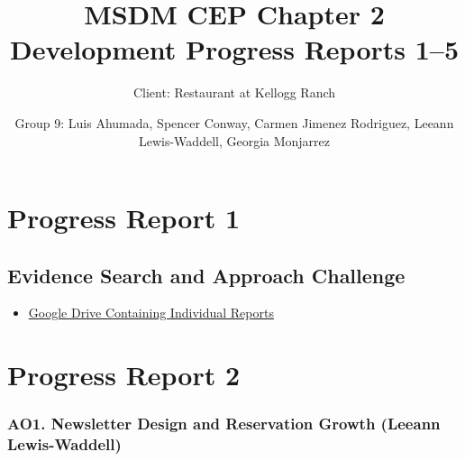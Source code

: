 \documentclass[
  12pt,
  letterpaper,
  DIV=11,
  numbers=noendperiod]{scrartcl}
\title{MSDM CEP Chapter 2 Development Progress Reports 1--5}
\subtitle{Client: Restaurant at Kellogg Ranch}
\author{Group 9: Luis Ahumada, Spencer Conway, Carmen Jimenez Rodriguez,
Leeann Lewis-Waddell, Georgia Monjarrez}
\date{}
\providecommand{\tightlist}{%
  \setlength{\itemsep}{0pt}\setlength{\parskip}{0pt}}
\renewcommand*\contentsname{Table of contents}
\newcommand\contentsname{Table of contents}
\begin{document}
\maketitle

\renewcommand*\contentsname{Table of contents}
{
\hypersetup{linkcolor=}
\setcounter{tocdepth}{3}
\tableofcontents
}

\section{Progress Report 1}\label{progress-report-1}

\subsection{Evidence Search and Approach
Challenge}\label{evidence-search-and-approach-challenge}

\begin{itemize}
\tightlist
\item
  \href{https://drive.google.com/drive/folders/1du_W7r7T4k9v3Y39YWYY-aHQAu7HKRU8?usp=sharing}{Google
  Drive Containing Individual Reports}
\end{itemize}

\section{Progress Report 2}\label{progress-report-2}

\subsubsection{AO1. Newsletter Design and Reservation Growth (Leeann
Lewis-Waddell)}\label{sec-ao1-title-ao1}
\end{document}
